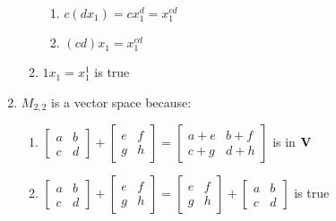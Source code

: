 \documentclass[12pt]{article}
\begin{document}
\begin{enumerate}
\begin{enumerate}
          \begin{enumerate}

            \item $c(dx_1)=cx_1^d=x_1^{cd}$

            \item $(cd)x_1=x_1^{cd}$

            \end{enumerate}

          \item $1x_1=x_1^1$ is true \textcolor{green}{\checkmark}

      \end{enumerate}

    \setcounter{enumi}{39}

  \item $M_{2,2}$ is a vector space because:

    \begin{enumerate}

      \item $\begin{bmatrix} a & b\\ c & d  \end{bmatrix}+\begin{bmatrix} e & f\\ g & h  \end{bmatrix}=\begin{bmatrix} a+e & b+f\\ c+g & d+h  \end{bmatrix}$ is in $\bold{V}$ \textcolor{green}{\checkmark}

      \item $\begin{bmatrix} a & b\\ c & d  \end{bmatrix}+\begin{bmatrix} e & f\\ g & h  \end{bmatrix}=\begin{bmatrix} e & f\\ g & h  \end{bmatrix}+\begin{bmatrix} a & b\\ c & d  \end{bmatrix}$ is true \textcolor{green}{\checkmark}


\end{enumerate}
\end{enumerate}
\end{document}
